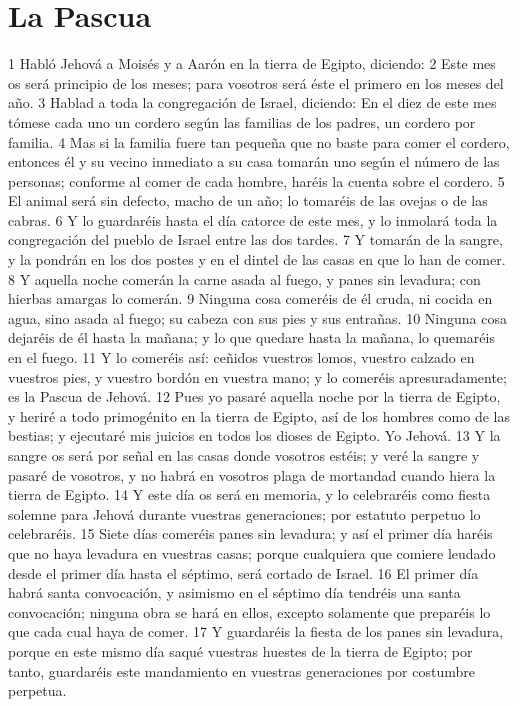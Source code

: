 \section{La Pascua}
1 Habló Jehová a Moisés y a Aarón en la tierra de Egipto, diciendo:
2 Este mes os será principio de los meses; para vosotros será éste el primero en los meses del año.
3 Hablad a toda la congregación de Israel, diciendo: En el diez de este mes tómese cada uno un cordero según las familias de los padres, un cordero por familia.
4 Mas si la familia fuere tan pequeña que no baste para comer el cordero, entonces él y su vecino inmediato a su casa tomarán uno según el número de las personas; conforme al comer de cada hombre, haréis la cuenta sobre el cordero.
5 El animal será sin defecto, macho de un año; lo tomaréis de las ovejas o de las cabras.
6 Y lo guardaréis hasta el día catorce de este mes, y lo inmolará toda la congregación del pueblo de Israel entre las dos tardes.
7 Y tomarán de la sangre, y la pondrán en los dos postes y en el dintel de las casas en que lo han de comer.
8 Y aquella noche comerán la carne asada al fuego, y panes sin levadura; con hierbas amargas lo comerán.
9 Ninguna cosa comeréis de él cruda, ni cocida en agua, sino asada al fuego; su cabeza con sus pies y sus entrañas.
10 Ninguna cosa dejaréis de él hasta la mañana; y lo que quedare hasta la mañana, lo quemaréis en el fuego.
11 Y lo comeréis así: ceñidos vuestros lomos, vuestro calzado en vuestros pies, y vuestro bordón en vuestra mano; y lo comeréis apresuradamente; es la Pascua de Jehová.
12 Pues yo pasaré aquella noche por la tierra de Egipto, y heriré a todo primogénito en la tierra de Egipto, así de los hombres como de las bestias; y ejecutaré mis juicios en todos los dioses de Egipto. Yo Jehová.
13 Y la sangre os será por señal en las casas donde vosotros estéis; y veré la sangre y pasaré de vosotros, y no habrá en vosotros plaga de mortandad cuando hiera la tierra de Egipto.
14 Y este día os será en memoria, y lo celebraréis como fiesta solemne para Jehová durante vuestras generaciones; por estatuto perpetuo lo celebraréis.
15 Siete días comeréis panes sin levadura; y así el primer día haréis que no haya levadura en vuestras casas; porque cualquiera que comiere leudado desde el primer día hasta el séptimo, será cortado de Israel.
16 El primer día habrá santa convocación, y asimismo en el séptimo día tendréis una santa convocación; ninguna obra se hará en ellos, excepto solamente que preparéis lo que cada cual haya de comer.
17 Y guardaréis la fiesta de los panes sin levadura, porque en este mismo día saqué vuestras huestes de la tierra de Egipto; por tanto, guardaréis este mandamiento en vuestras generaciones por costumbre perpetua.
